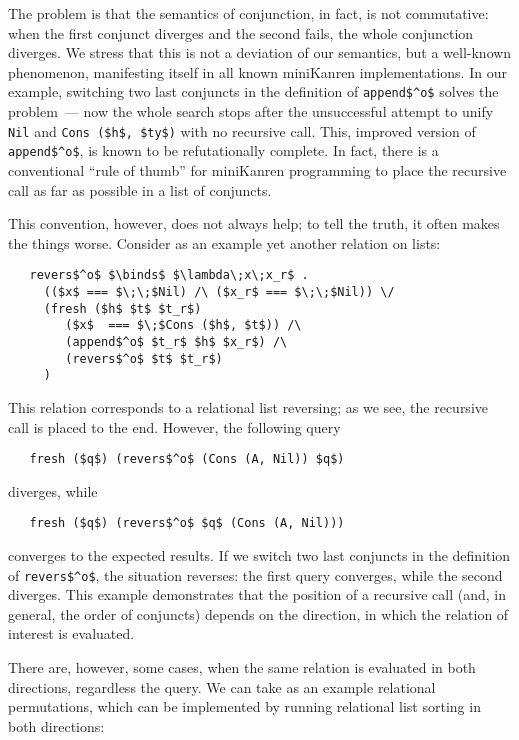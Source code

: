 The problem is that the semantics of conjunction, in fact, is not commutative: when the first conjunct diverges and the second fails, the whole
conjunction diverges. We stress that this is not a deviation of our semantics, but a well-known phenomenon, manifesting itself in all known
miniKanren implementations. In our example, switching two last conjuncts in the definition of \lstinline|append$^o$| solves the problem~---
now the whole search stops after the unsuccessful attempt to unify \lstinline|Nil| and \lstinline|Cons ($h$, $ty$)| with no recursive call.
This, improved version of \lstinline|append$^o$|, is known to be refutationally complete. In fact, there is a conventional ``rule of thumb''
for miniKanren programming to place the recursive call as far as possible in a list of conjuncts. 

This convention, however, does not always help; to tell the truth, it often makes the things worse. Consider 
as an example yet another relation on lists:

\begin{lstlisting}
   revers$^o$ $\binds$ $\lambda\;x\;x_r$ . 
     (($x$ === $\;\;$Nil) /\ ($x_r$ === $\;\;$Nil)) \/
     (fresh ($h$ $t$ $t_r$)
        ($x$  === $\;$Cons ($h$, $t$)) /\
        (append$^o$ $t_r$ $h$ $x_r$) /\
        (revers$^o$ $t$ $t_r$)
     )
\end{lstlisting}

This relation corresponds to a relational list reversing; as we see, the recursive call is placed to
the end. However, the following query

\begin{lstlisting}
   fresh ($q$) (revers$^o$ (Cons (A, Nil)) $q$)
\end{lstlisting}

\noindent diverges, while

\begin{lstlisting}
   fresh ($q$) (revers$^o$ $q$ (Cons (A, Nil)))
\end{lstlisting}

\noindent converges to the expected results. If we switch two last conjuncts in the definition of
\lstinline|revers$^o$|, the situation reverses: the first query converges, while the second diverges. 
This example demonstrates that the position of a recursive call (and, in general, the order of
conjuncts) depends on the direction, in which the relation of interest is evaluated.

There are, however, some cases, when the same relation is evaluated in both directions, regardless
the query. We can take as an example relational permutations, which can be implemented by running
relational list sorting in both directions:

